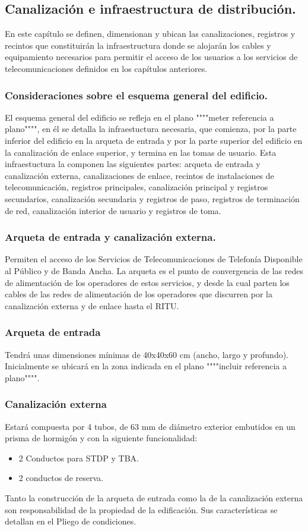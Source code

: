 \subsection{Canalización e infraestructura de distribución.}
En este capítulo se definen, dimensionan y ubican las canalizaciones, registros y recintos que constituirán la infraestructura donde se alojarán los cables y equipamiento necesarios para permitir el acceso de los usuarios a los servicios de telecomunicaciones definidos en los capítulos anteriores.
\subsubsection{Consideraciones sobre el esquema general del edificio.}
El esquema general del edificio se refleja en el plano """"meter referencia a plano"""", en él se detalla la infraestuctura necesaria, que comienza, por la parte inferior del edificio en la arqueta de entrada y por la parte superior del edificio en la canalización de enlace superior, y termina en las tomas de usuario. Esta infraestuctura la componen las siguientes partes: arqueta de entrada y canalización externa, canalizaciones de enlace, recintos de instalaciones de telecomunicación, registros principales, canalización principal y registros secundarios, canalización secundaria y registros de paso, registros de terminación de red, canalización interior de usuario y registros de toma.
\subsubsection{Arqueta de entrada y canalización externa.}
Permiten el acceso de los Servicios de Telecomunicaciones de Telefonía Disponible al Público y de Banda Ancha. La arqueta es el punto de convergencia de las redes de alimentación de los operadores de estos servicios, y desde la cual parten los cables de las redes de alimentación de los operadores que discurren por la canalización externa y de enlace hasta el RITU.

\subsubsection*{Arqueta de entrada}
Tendrá unas dimensiones mínimas de 40x40x60 cm (ancho, largo y profundo). Inicialmente se ubicará en la zona indicada en el plano """"incluir referencia a plano"""".
\subsubsection*{Canalización externa}
Estará compuesta por 4 tubos, de 63 mm de diámetro exterior embutidos en un prisma de hormigón y con la siguiente funcionalidad:
\begin{itemize}
	\item 2 Conductos para STDP y TBA.
	\item 2 conductos de reserva.
\end{itemize}
Tanto la construcción de la arqueta de entrada como la de la canalización externa son responsabilidad de la propiedad de la edificación.
Sus características se detallan en el Pliego de condiciones.
